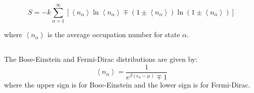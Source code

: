 \documentclass[10pt]{article}
\begin{document}
$$
S=-k \sum_{\alpha=1}^{\infty}\left[\left\langle n_{\alpha}\right\rangle \ln \left\langle n_{\alpha}\right\rangle \mp\left(1 \pm\left\langle n_{\alpha}\right\rangle\right) \ln \left(1 \pm\left\langle n_{\alpha}\right\rangle\right)\right]
$$

where $\left\langle n_{\alpha}\right\rangle$ is the average occupation number for state $\alpha$.
\subsection{}
The Bose-Einstein and Fermi-Dirac distributions are given by:
\begin{equation}
  \left\langle n_{\alpha}\right\rangle=\frac{1}{e^{\beta\left(\epsilon_{\alpha}-\mu\right)}\mp 1}
\end{equation}
where the upper sign is for Bose-Einstein and the lower sign is for Fermi-Dirac.
\end{document}
